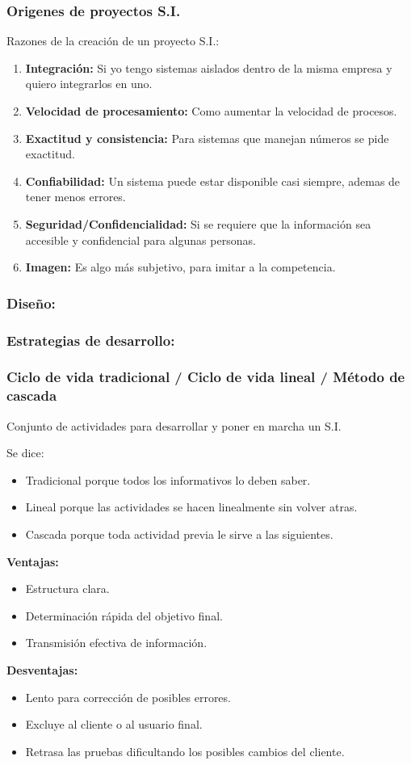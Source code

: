 \documentclass{templateNote}
\begin{document}
\subsubsection*{Origenes de proyectos S.I.}
Razones de la creaci\'on de un proyecto S.I.:
\begin{enumerate}
    \item \textbf{Integraci\'on:} Si yo tengo sistemas aislados dentro de la misma empresa y quiero integrarlos en uno.
    \item \textbf{Velocidad de procesamiento:} Como aumentar la velocidad de procesos.
    \item \textbf{Exactitud y consistencia:} Para sistemas que manejan n\'umeros se pide exactitud.
    \item \textbf{Confiabilidad:} Un sistema puede estar disponible casi siempre, ademas de tener menos errores.
    \item \textbf{Seguridad/Confidencialidad:} Si se requiere que la informaci\'on sea accesible y confidencial para algunas personas.
    \item \textbf{Imagen:} Es algo m\'as subjetivo, para imitar a la competencia.
\end{enumerate}

\newpage
\subsubsection{Dise\~no:}
\subsubsection*{Estrategias de desarrollo:}
\subsubsection*{Ciclo de vida tradicional / Ciclo de vida lineal / M\'etodo de cascada}
Conjunto de actividades para desarrollar y poner en marcha un S.I.

Se dice:
\begin{itemize}
    \item Tradicional porque todos los informativos lo deben saber.
    \item Lineal porque las actividades se hacen linealmente sin volver atras.
    \item Cascada porque toda actividad previa le sirve a las siguientes.
\end{itemize}
\textbf{Ventajas:}
\begin{itemize}
    \item Estructura clara.
    \item Determinaci\'on r\'apida del objetivo final.
    \item Transmisi\'on efectiva de informaci\'on.
\end{itemize}
\textbf{Desventajas:}
\begin{itemize}
    \item Lento para correcci\'on de posibles errores.
    \item Excluye al cliente o al usuario final.
    \item Retrasa las pruebas dificultando los posibles cambios del cliente.
\end{itemize}
\end{document}

